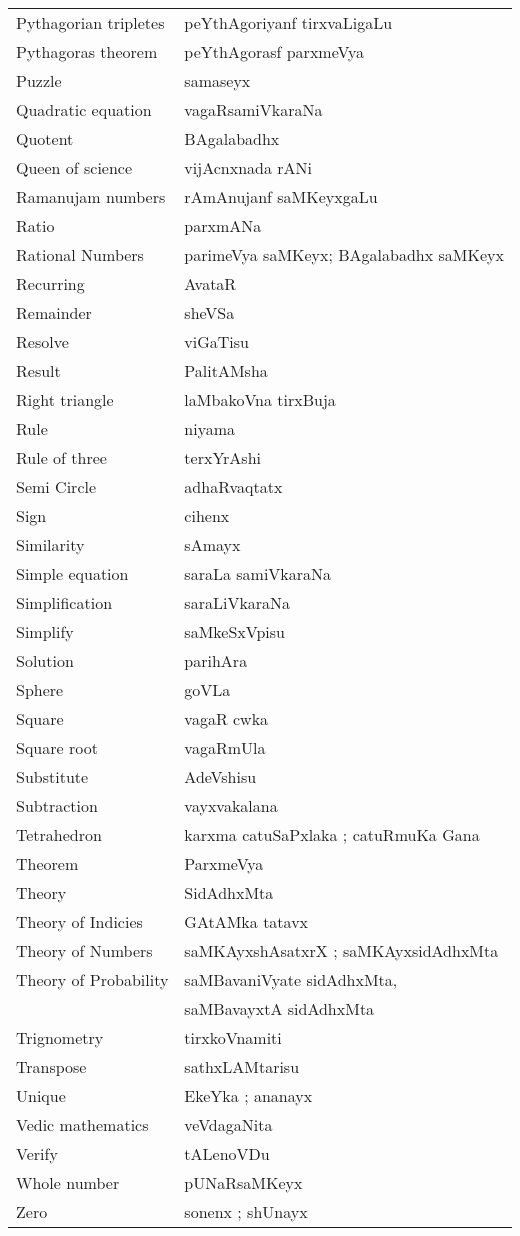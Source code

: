 {\begin{longtable}{>{\rm}l@{\hspace{1cm}}l}
Pythagorian tripletes & peYthAgoriyanf tirxvaLigaLu\\
Pythagoras theorem & peYthAgorasf parxmeVya\\
Puzzle & samaseyx\\
Quadratic equation & vagaRsamiVkaraNa\\
Quotent & BAgalabadhx\\
Queen of science & vijAcnxnada rANi\\
Ramanujam numbers & rAmAnujanf saMKeyxgaLu\\
Ratio & parxmANa\\
Rational Numbers & parimeVya saMKeyx; BAgalabadhx saMKeyx\\
Recurring & AvataR\\
Remainder & sheVSa\\
Resolve & viGaTisu\\
Result & PalitAMsha\\
Right triangle & laMbakoVna tirxBuja\\
Rule & niyama\\
Rule of three & terxYrAshi\\
Semi Circle & adhaRvaqtatx\\
Sign & cihenx\\
Similarity & sAmayx\\
Simple equation & saraLa samiVkaraNa\\
Simplification & saraLiVkaraNa\\
Simplify & saMkeSxVpisu\\
Solution & parihAra\\
Sphere & goVLa\\
Square & vagaR cwka\\
Square root & vagaRmUla\\
Substitute & AdeVshisu\\
Subtraction & vayxvakalana\\
Tetrahedron & karxma catuSaPxlaka ; catuRmuKa Gana\\
Theorem & ParxmeVya\\
Theory & SidAdhxMta\\
Theory of Indicies & GAtAMka tatavx\\
Theory of Numbers & saMKAyxshAsatxrX ; saMKAyxsidAdhxMta\\
Theory of Probability & saMBavaniVyate sidAdhxMta,\\[-0.1cm] 
 &saMBavayxtA sidAdhxMta\\
Trignometry & tirxkoVnamiti\\
Transpose & sathxLAMtarisu\\
Unique & EkeYka ; ananayx\\
Vedic mathematics & veVdagaNita\\
Verify & tALenoVDu\\
Whole number & pUNaRsaMKeyx\\
Zero & sonenx ; shUnayx
\end{longtable}

}
